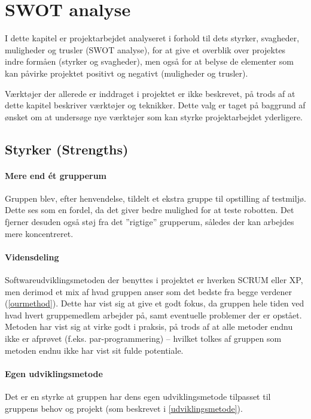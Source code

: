 \section{SWOT analyse}\label{swot:analyse}
I dette kapitel er projektarbejdet analyseret i forhold til dets styrker, svagheder, muligheder og trusler (SWOT analyse), for at give et overblik over projektes indre formåen (styrker og svagheder), men også for at belyse de elementer som kan påvirke projektet positivt og negativt (muligheder og trusler).

Værktøjer der allerede er inddraget i projektet er ikke beskrevet, på trods af at dette kapitel beskriver værktøjer og teknikker.
Dette valg er taget på baggrund af ønsket om at undersøge nye værktøjer som kan styrke projektarbejdet yderligere.

\subsection{Styrker \textnormal{(\textbf{S}trengths)}}

\paragraph{Mere end ét grupperum}
Gruppen blev, efter henvendelse, tildelt et ekstra gruppe til opstilling af testmiljø.
Dette ses som en fordel, da det giver bedre mulighed for at teste robotten.
Det fjerner desuden også støj fra det ''rigtige'' grupperum, således der kan arbejdes mere koncentreret.

\paragraph{Vidensdeling}
Softwareudviklingsmetoden der benyttes i projektet er hverken SCRUM eller XP, men derimod et mix af hvad gruppen anser som det bedste fra begge verdener (\cref{ourmethod}).
Dette har vist sig at give et godt fokus, da gruppen hele tiden ved hvad hvert gruppemedlem arbejder på, samt eventuelle problemer der er opstået.
Metoden har vist sig at virke godt i praksis, på trods af at alle metoder endnu ikke er afprøvet (f.eks. par-programmering) -- hvilket tolkes af gruppen som metoden endnu ikke har vist sit fulde potentiale.

\paragraph{Egen udviklingsmetode}
Det er en styrke at gruppen har dens egen udviklingsmetode tilpasset til gruppens behov og projekt (som beskrevet i \cref{udviklingsmetode}).

